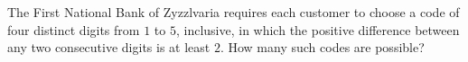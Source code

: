 The First National Bank of Zyzzlvaria requires each customer to choose a code of four distinct digits from $1$ to $5$, inclusive, in which the positive difference between any two consecutive digits is at least $2$. How many such codes are possible?
